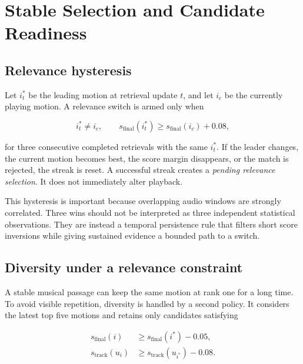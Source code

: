 \section{Stable Selection and Candidate Readiness}
\label{sec:ch5_stable_selection}

\subsection{Relevance hysteresis}
\label{subsec:ch5_relevance_hysteresis}

Let $i_t^{*}$ be the leading motion at retrieval update $t$, and let $i_c$ be
the currently playing motion. A relevance switch is armed only when

\begin{equation}
    i_t^{*}\neq i_c,
    \qquad
    s_{\mathrm{final}}(i_t^{*})
       \geq s_{\mathrm{final}}(i_c)+0.08,
    \label{eq:ch5_relevance_margin}
\end{equation}

for three consecutive completed retrievals with the same $i_t^{*}$. If the
leader changes, the current motion becomes best, the score margin disappears,
or the match is rejected, the streak is reset. A successful streak creates a
\emph{pending relevance selection}. It does not immediately alter playback.

This hysteresis is important because overlapping audio windows are strongly
correlated. Three wins should not be interpreted as three independent
statistical observations. They are instead a temporal persistence rule that
filters short score inversions while giving sustained evidence a bounded path
to a switch.

\subsection{Diversity under a relevance constraint}
\label{subsec:ch5_diversity_selection}

A stable musical passage can keep the same motion at rank one for a long time.
To avoid visible repetition, diversity is handled by a second policy. It
considers the latest top five motions and retains only candidates satisfying

\begin{equation}
\begin{aligned}
    s_{\mathrm{final}}(i)&\geq s_{\mathrm{final}}(i^{*})-0.05,\\
    s_{\mathrm{track}}(u_i)&\geq s_{\mathrm{track}}(u_{i^{*}})-0.08.
\end{aligned}
    \label{eq:ch5_diversity_eligibility}
\end{equation}

